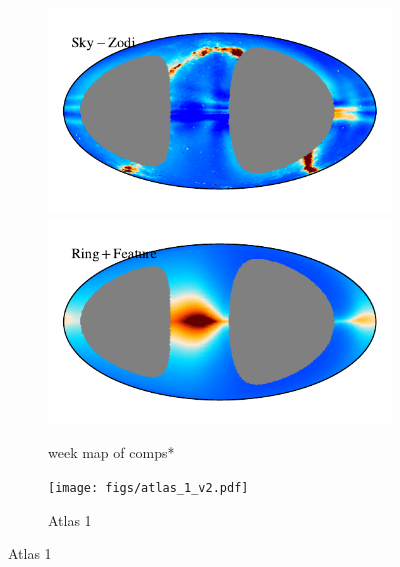 \documentclass{aa}
\begin{document}
\begin{figure}
\begin{figure}
\includegraphics[width=0.9\columnwidth]{figs/zodi_comps/zodi_res_98_week.pdf}\includegraphics[width=0.9\columnwidth]{figs/zodi_comps/zodi_ring+feature_98_week.pdf}
\caption{week map of comps*}
\label{fig: K98 week comparison}
\end{figure}


\begin{figure}
  \centering
   	\texttt{[image: figs/atlas\_1\_v2.pdf]}
  	\caption{Atlas 1}
	\label{fig: atlas1}
\end{figure}


\end{figure}
\end{document}
